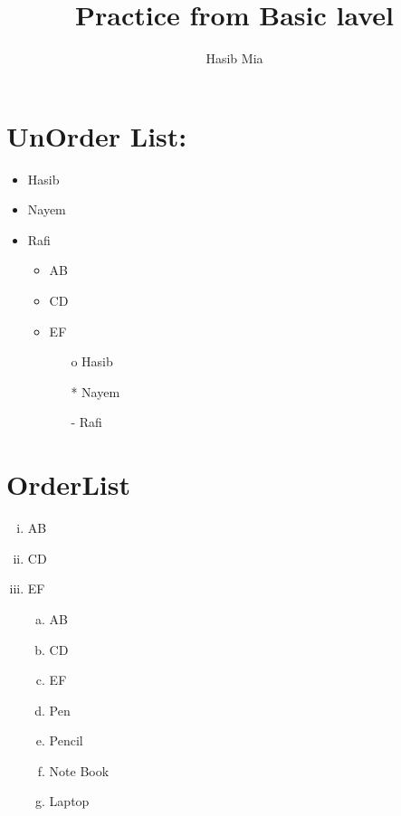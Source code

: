\documentclass{article}
\author{Hasib Mia}
\title{Practice from Basic lavel}
\begin{document}
	\maketitle
	
	\section{UnOrder List:}
	\begin{itemize}
		\item Hasib
		\item  Nayem
		\item Rafi
		\begin{itemize}
			\item AB
			\item  CD
			\item EF
			\begin{itemize}
				\item[o] Hasib
				\item [*] Nayem
				\item[-] Rafi
				
			\end{itemize}
			
		\end{itemize}
	\end{itemize}
	\section{OrderList}
	\begin{enumerate}[i.]
			\item AB
		\item  CD
		\item EF
			\begin{enumerate}[a.]
			\item AB
			\item  CD
			\item EF
			\item Pen
			\item Pencil
			\item Note Book
			\item Laptop
		\end{enumerate}
	\end{enumerate}
		

	
	
	
	
	
	
	
	
	
	
	
	
	
	
	
\end{document}
